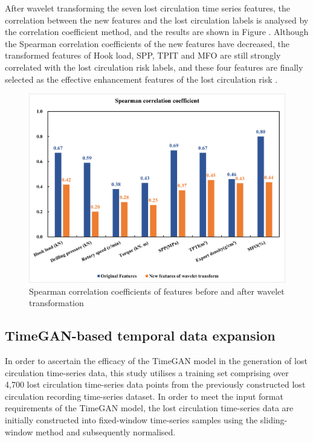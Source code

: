 \documentclass[journal,article,submit,pdftex,moreauthors]{Definitions/mdpi}
\begin{document}
After wavelet transforming the seven  lost circulation time series features, the correlation between the new features and the  lost circulation labels is analysed by the correlation coefficient method, and the results are shown in Figure  \label{fig:Sperman correlation coefficients of features before and after wavelet transformation}. Although the Spearman correlation coefficients of the new features have decreased, the transformed features of Hook load, SPP, TPIT and MFO are still strongly correlated with the lost circulation risk labels, and these four features are finally selected as the effective enhancement features of the lost circulation risk .

\begin{figure}[h]
    \centering
    \includegraphics[width=0.75\linewidth]{图片/spearman相关系数.png}
    \caption{Spearman correlation coefficients of features before and after wavelet transformation}
    \label{fig:Spearman correlation coefficients of features before and after wavelet transformation}
\end{figure}
\subsection{TimeGAN-based temporal data expansion}

In order to ascertain the efficacy of the TimeGAN model in the generation of lost circulation time-series data, this study utilises a training set comprising over 4,700 lost circulation time-series data points from the previously constructed lost circulation recording time-series dataset. In order to meet the input format requirements of the TimeGAN model, the lost circulation time-series data are initially constructed into fixed-window time-series samples using the sliding-window method and subsequently normalised. 
\end{document}
